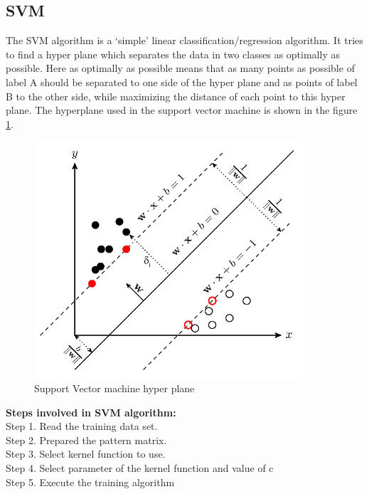 \subsection{SVM}
The SVM algorithm is a ‘simple’ linear classification/regression algorithm. It tries to find a hyper plane which separates the data in two classes as optimally as possible. Here as optimally as possible means that as many points as possible of label A should be separated to one side of the hyper plane and as points of label B to the other side, while maximizing the distance of each point to this hyper plane. The hyperplane used in the support vector machine is shown in the figure \ref{fig: SVM_hperplane}.\\
\begin{figure}[H] 
	\centering 
	\vspace{20pt}\includegraphics[width=10cm]{images/SVM.png}
	\caption{Support Vector machine hyper plane} 
	\label{fig: SVM_hperplane}
\end{figure}
\textbf{Steps involved in SVM algorithm:}\\
Step 1. Read the training data set. \\
Step 2. Prepared the pattern matrix.\\ 
Step 3. Select kernel function to use. \\
Step 4. Select parameter of the kernel function and value of c \\
Step 5. Execute the training algorithm
